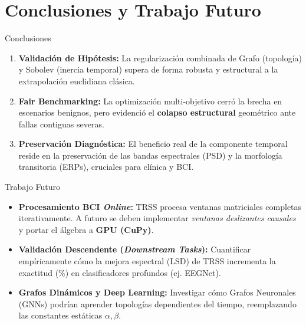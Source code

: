 \documentclass[10pt, aspectratio=169]{beamer}
\begin{document}
\section{Conclusiones y Trabajo Futuro}

\begin{frame}{Conclusiones}
    \begin{enumerate}
        \item \textbf{Validación de Hipótesis:} La regularización combinada de Grafo (topología) y Sobolev (inercia temporal) supera de forma robusta y estructural a la extrapolación euclidiana clásica.
        \item \textbf{Fair Benchmarking:} La optimización multi-objetivo cerró la brecha en escenarios benignos, pero evidenció el \textbf{colapso estructural} geométrico ante fallas contiguas severas.
        \item \textbf{Preservación Diagnóstica:} El beneficio real de la componente temporal reside en la preservación de las bandas espectrales (PSD) y la morfología transitoria (ERPs), cruciales para clínica y BCI.
    \end{enumerate}
\end{frame}

\begin{frame}{Trabajo Futuro}
    \begin{itemize}
        \item \textbf{Procesamiento BCI \textit{Online}:} TRSS procesa ventanas matriciales completas iterativamente. A futuro se deben implementar \textit{ventanas deslizantes causales} y portar el álgebra a \textbf{GPU (CuPy)}.
        \item \textbf{Validación Descendente (\textit{Downstream Tasks}):} Cuantificar empíricamente cómo la mejora espectral (LSD) de TRSS incrementa la exactitud (\%) en clasificadores profundos (ej. EEGNet).
        \item \textbf{Grafos Dinámicos y Deep Learning:} Investigar cómo Grafos Neuronales (GNNs) podrían aprender topologías dependientes del tiempo, reemplazando las constantes estáticas $\alpha, \beta$.
    \end{itemize}
\end{frame}
\end{document}
